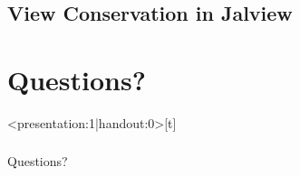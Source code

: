 \documentclass[a4paper,10pt,xcolor=pdftex,dvipsnames,table]{beamer}
\begin{document}
\subsection{View Conservation in Jalview}
\begin{frame}[t]\frametitle{\insertsubsection}
    \elmlogo
    \note{~}
    \begin{center}
    \end{center}
\end{frame}

\section{Questions?}
\begin{frame}<presentation:1|handout:0>[t]\frametitle{}
    \note{~}
    \begin{center}
      \vspace*{-0.5cm}\huge{Questions?}
    \end{center}
\end{frame}
\end{document}
